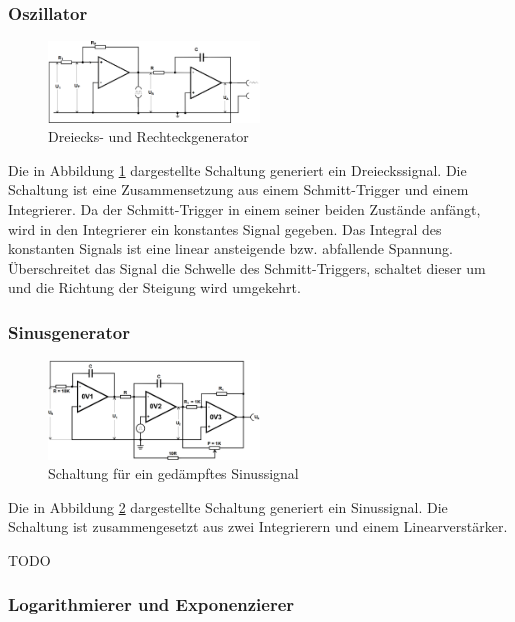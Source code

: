\subsubsection{Oszillator}

\begin{figure}
	\centering
	\includegraphics[width=0.5\textwidth]{img/oszi.png}
	\caption{Dreiecks- und Rechteckgenerator \cite{v51}}
	\label{fig:oszi}
\end{figure}

Die in Abbildung \ref{fig:oszi} dargestellte Schaltung generiert ein Dreieckssignal.
Die Schaltung ist eine Zusammensetzung aus einem Schmitt-Trigger und einem Integrierer.
Da der Schmitt-Trigger in einem seiner beiden Zustände anfängt, wird in den Integrierer ein konstantes Signal gegeben.
Das Integral des konstanten Signals ist eine linear ansteigende bzw. abfallende Spannung.
Überschreitet das Signal die Schwelle des Schmitt-Triggers, schaltet dieser um und die Richtung der Steigung wird umgekehrt.

\subsubsection{Sinusgenerator}

\begin{figure}
	\centering
	\includegraphics[width=0.5\textwidth]{img/sinus.png}
	\caption{Schaltung für ein gedämpftes Sinussignal \cite{v51}}
	\label{fig:sin}
\end{figure}

Die in Abbildung \ref{fig:sin} dargestellte Schaltung generiert ein Sinussignal.
Die Schaltung ist zusammengesetzt aus zwei Integrierern und einem Linearverstärker.

TODO

\subsubsection{Logarithmierer und Exponenzierer}

